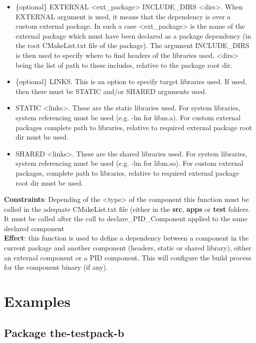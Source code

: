 \documentclass[12pt,a4paper]{article}
\begin{document}
\begin{itemize}
\begin{itemize}
\item \{optional\} EXTERNAL <ext\_package> INCLUDE\_DIRS <dirs>. When EXTERNAL argument is used, it means that the dependency is over a custom external package. In such a case <ext\_package> is the name of the external package which must have been declared as a package dependency (in the root CMakeList.txt file of the package). The argument INCLUDE\_DIRS is then used to specify where to find headers of the libraries used, <dirs> being the list of path to these includes, relative to the package root dir.
\item \{optional\} LINKS. This is an option to specify target libraries used. If used, then there must be STATIC and/or SHARED arguments used.
\item STATIC <links>. These are the static libraries used. For system libraries, system referencing must be used (e.g. -lm for libm.a). For custom external packages complete path to libraries, relative to required external package root dir must be used.
\item SHARED <links>. These are the shared libraries used. For system libraries, system referencing must be used (e.g. -lm for libm.so). For custom external packages, complete path to libraries, relative to required external package root dir must be used.
\end{itemize}
\end{itemize}
\textbf{Constraints}: Depending of the <type> of the component this function must be called in the adequate CMakeList.txt file (either in the \textbf{src}, \textbf{apps} or \textbf{test} folders. It must be called after the call to declare\_PID\_Component applied to the same declared component\\
\textbf{Effect}: this function is used to define a dependency between a component in the current package and another component (headers, static or shared library), either an external component or a PID component. This will configure the build process for the component binary (if any).

\pagebreak

\section{Examples}
\label{sec:Examples}

\subsection{Package the-testpack-b}
\end{document}
